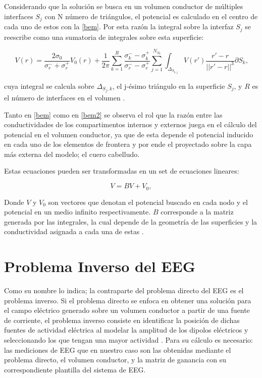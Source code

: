 Considerando que la solución se busca en un volumen conductor de múltiples interfaces $S_{j}$ con N número de triángulos, el potencial es calculado en el centro de cada uno de estos con la \cref{bem}. Por esta razón la integral sobre la interfaz $S_{j}$ se reescribe como una sumatoria de integrales sobre esta superficie:

\begin{equation}
	\label{bem2}
	V(r) = \frac{2\sigma_{0}}{\sigma_{r}^{-} + {\sigma_{r}^{+}}} V_{0}(r) + \frac{1}{2\pi} \sum_{k=1}^{R}\frac{\sigma_{k}^{-}-\sigma_{k}^{+}}{\sigma_{r}^{-}-\sigma_{r}^{+}} \sum_{j=1}^{N_{S_{k}}} \int_{\Delta_{S_{k,j}}} V(r') \frac{r'-r}{||r'-r||^3}\partial S_{k}\text{,}
\end{equation}

cuya integral se calcula sobre $\Delta_{S_{j},k}$, el j-ésimo triángulo en la superficie $S_{j}$, y $R$ es el número de interfaces en el volumen \cite{Hallez2007}. 

Tanto en \cref{bem} como en \cref{bem2} se observa el rol que la razón entre las conductividades de los compartimentos internos y externos juega en el cálculo del potencial en el volumen conductor, ya que de esta depende el potencial inducido en cada uno de los elementos de frontera y por ende el proyectado sobre la capa más externa del modelo; el cuero cabelludo.

Estas ecuaciones pueden ser transformadas en un set de ecuaciones lineares:

\begin{equation}
	\label{lineal}
	V = BV + V_{0},
\end{equation}

Donde $V$ y $V_{0}$ son vectores que denotan el potencial buscado en cada nodo y el potencial en un medio infinito respectivamente. $B$ corresponde a la matriz generada por las integrales, la cual depende de la geometría de las superficies y la conductividad asignada a cada una de estas \cite{Hallez2007}.

\section{Problema Inverso del EEG}
\label{sec:intro:inverse}

Como su nombre lo indica; la contraparte del problema directo del EEG es el problema inverso. Si el problema directo se enfoca en obtener una solución para el campo eléctrico generado sobre un volumen conductor a partir de una fuente de corriente, el problema inverso consiste en identificar la posición de dichas fuentes de actividad eléctrica al modelar la amplitud de los dipolos eléctricos y seleccionando los que tengan una mayor actividad \cite{Baillet2001}. Para su cálculo es necesario: las mediciones de EEG que en nuestro caso son las obtenidas mediante el problema directo, el volumen conductor, y la matriz de ganancia con su correspondiente plantilla del sistema de EEG.

